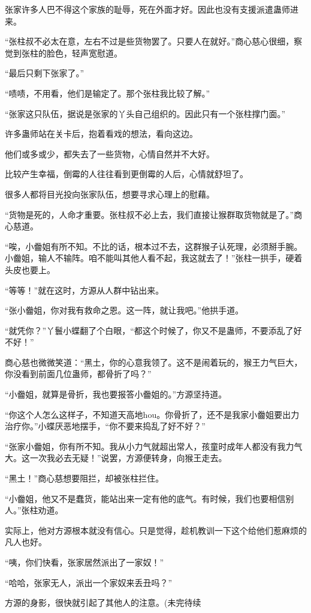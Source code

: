 \begin{this_body}
张家许多人巴不得这个家族的耻辱，死在外面才好。因此也没有支援派遣蛊师进来。

“张柱叔不必太在意，左右不过是些货物罢了。只要人在就好。”商心慈心很细，察觉到张柱的脸色，轻声宽慰道。

“最后只剩下张家了。”

“啧啧，不用看，他们是输定了。那个张柱我比较了解。”

“张家这只队伍，据说是张家的丫头自己组织的。因此只有一个张柱撑门面。”

许多蛊师站在关卡后，抱着看戏的想法，看向这边。

他们或多或少，都失去了一些货物，心情自然并不大好。

比较产生幸福，倒霉的人往往看到更倒霉的人后，心情就舒坦了。

很多人都将目光投向张家队伍，想要寻求心理上的慰藉。

“货物是死的，人命才重要。张柱叔不必上去，我们直接让猴群取货物就是了。”商心慈道。

“唉，小齤姐有所不知。不比的话，根本过不去，这群猴子认死理，必须掰手腕。小齤姐，输人不输阵。咱不能叫其他人看不起，我这就去了！”张柱一拱手，硬着头皮也要上。

“等等！”就在这时，方源从人群中钻出来。

“张小齤姐，你对我有救命之恩。这一阵，就让我吧。”他拱手道。

“就凭你？”丫鬟小蝶翻了个白眼，“都这个时候了，你又不是蛊师，不要添乱了好不好！”

商心慈也微微笑道：“黑土，你的心意我领了。这不是闹着玩的，猴王力气巨大，你没看到前面几位蛊师，都骨折了吗？”

“小齤姐，就算是骨折，我也要报答小齤姐的。”方源坚持道。

“你这个人怎么这样子，不知道天高地hou。你骨折了，还不是我家小齤姐要出力治疗你。”小蝶厌恶地摆手，“你不要来捣乱了好不好？”

“张家小齤姐，你有所不知。我从小力气就超出常人，孩童时成年人都没有我力气大。这一次我必去无疑！”说罢，方源便转身，向猴王走去。

“黑土！”商心慈想要阻拦，却被张柱拦住。

“小齤姐，他又不是蠢货，能站出来一定有他的底气。有时候，我们也要相信别人。”张柱劝道。

实际上，他对方源根本就没有信心。只是觉得，趁机教训一下这个给他们惹麻烦的凡人也好。

“咦，你们快看，张家居然派出了一家奴！”

“哈哈，张家无人，派出一个家奴来丢丑吗？”

方源的身影，很快就引起了其他人的注意。(未完待续

\end{this_body}

